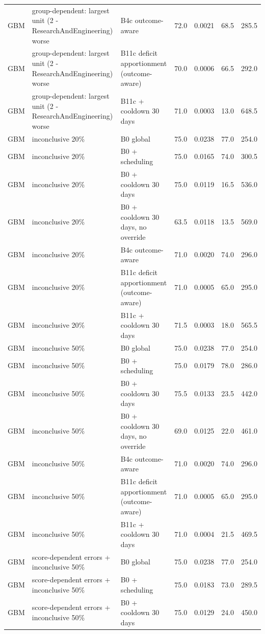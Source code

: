 \begin{longtable}{lp{5.2cm}p{4.4cm}cccc}
GBM & group-dependent: largest unit (2 - ResearchAndEngineering) worse & B4c outcome-aware & 72.0 & 0.0021 & 68.5 & 285.5 \\
GBM & group-dependent: largest unit (2 - ResearchAndEngineering) worse & B11c deficit apportionment (outcome-aware) & 70.0 & 0.0006 & 66.5 & 292.0 \\
GBM & group-dependent: largest unit (2 - ResearchAndEngineering) worse & B11c + cooldown 30 days & 71.0 & 0.0003 & 13.0 & 648.5 \\
GBM & inconclusive 20\% & B0 global & 75.0 & 0.0238 & 77.0 & 254.0 \\
GBM & inconclusive 20\% & B0 + scheduling & 75.0 & 0.0165 & 74.0 & 300.5 \\
GBM & inconclusive 20\% & B0 + cooldown 30 days & 75.0 & 0.0119 & 16.5 & 536.0 \\
GBM & inconclusive 20\% & B0 + cooldown 30 days, no override & 63.5 & 0.0118 & 13.5 & 569.0 \\
GBM & inconclusive 20\% & B4c outcome-aware & 71.0 & 0.0020 & 74.0 & 296.0 \\
GBM & inconclusive 20\% & B11c deficit apportionment (outcome-aware) & 71.0 & 0.0005 & 65.0 & 295.0 \\
GBM & inconclusive 20\% & B11c + cooldown 30 days & 71.5 & 0.0003 & 18.0 & 565.5 \\
GBM & inconclusive 50\% & B0 global & 75.0 & 0.0238 & 77.0 & 254.0 \\
GBM & inconclusive 50\% & B0 + scheduling & 75.0 & 0.0179 & 78.0 & 286.0 \\
GBM & inconclusive 50\% & B0 + cooldown 30 days & 75.5 & 0.0133 & 23.5 & 442.0 \\
GBM & inconclusive 50\% & B0 + cooldown 30 days, no override & 69.0 & 0.0125 & 22.0 & 461.0 \\
GBM & inconclusive 50\% & B4c outcome-aware & 71.0 & 0.0020 & 74.0 & 296.0 \\
GBM & inconclusive 50\% & B11c deficit apportionment (outcome-aware) & 71.0 & 0.0005 & 65.0 & 295.0 \\
GBM & inconclusive 50\% & B11c + cooldown 30 days & 71.0 & 0.0004 & 21.5 & 469.5 \\
GBM & score-dependent errors + inconclusive 50\% & B0 global & 75.0 & 0.0238 & 77.0 & 254.0 \\
GBM & score-dependent errors + inconclusive 50\% & B0 + scheduling & 75.0 & 0.0183 & 73.0 & 289.5 \\
GBM & score-dependent errors + inconclusive 50\% & B0 + cooldown 30 days & 75.0 & 0.0129 & 24.0 & 450.0 \\

\end{longtable}
